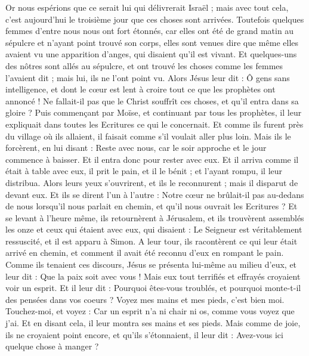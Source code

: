 \begin{multicols}{2}
Or nous espérions que ce serait lui qui délivrerait Israël ; mais avec tout cela, c'est aujourd'hui le troisième jour que ces choses sont arrivées.
Toutefois quelques femmes d'entre nous nous ont fort étonnés, car elles ont été de grand matin au sépulcre
et n'ayant point trouvé son corps, elles sont venues dire que même elles avaient vu une apparition d'anges, qui disaient qu'il est vivant.
Et quelques-uns des nôtres sont allés au sépulcre, et ont trouvé les choses comme les femmes l'avaient dit ; mais lui, ils ne l'ont point vu.
Alors Jésus leur dit : Ô gens sans intelligence, et dont le cœur est lent à croire tout ce que les prophètes ont annoncé !
Ne fallait-il pas que le Christ souffrît ces choses, et qu'il entra dans sa gloire ?
Puis commençant par Moïse, et continuant par tous les prophètes, il leur expliquait dans toutes les Ecritures ce qui le concernait.
Et comme ils furent près du village où ils allaient, il faisait comme s'il voulait aller plus loin.
Mais ils le forcèrent, en lui disant : Reste avec nous, car le soir approche et le jour commence à baisser. Et il entra donc pour rester avec eux.
Et il arriva comme il était à table avec eux, il prit le pain, et il le bénit ; et l'ayant rompu, il leur distribua.
Alors leurs yeux s'ouvrirent, et ils le reconnurent ; mais il disparut de devant eux.
Et ils se dirent l'un à l'autre : Notre cœur ne brûlait-il pas au-dedans de nous lorsqu'il nous parlait en chemin, et qu'il nous ouvrait les Ecritures ?
Et se levant à l'heure même, ils retournèrent à Jérusalem, et ils trouvèrent assemblés les onze et ceux qui étaient avec eux,
qui disaient : Le Seigneur est véritablement ressuscité, et il est apparu à Simon.
A leur tour, ils racontèrent ce qui leur était arrivé en chemin, et comment il avait été reconnu d'eux en rompant le pain.
Comme ils tenaient ces discours, Jésus se présenta lui-même au milieu d'eux, et leur dit : Que la paix soit avec vous !
Mais eux tout terrifiés et effrayés croyaient voir un esprit.
Et il leur dit : Pourquoi êtes-vous troublés, et pourquoi monte-t-il des pensées dans vos coeurs ?
Voyez mes mains et mes pieds, c'est bien moi. Touchez-moi, et voyez : Car un esprit n'a ni chair ni os, comme vous voyez que j'ai.
Et en disant cela, il leur montra ses mains et ses pieds.
Mais comme de joie, ils ne croyaient point encore, et qu'ils s'étonnaient, il leur dit : Avez-vous ici quelque chose à manger ?

\end{multicols}
